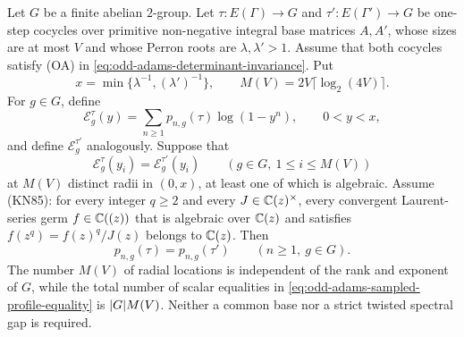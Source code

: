 \begin{theorem}
\label{thm:odd-adams-abelian-two-group-finite-sampling}
Let \(G\) be a finite abelian \(2\)-group.  Let
\(\tau:E(\Gamma)\to G\) and \(\tau':E(\Gamma')\to G\) be one-step
cocycles over primitive non-negative integral base matrices \(A,A'\), whose
sizes are at most \(V\) and whose Perron roots are
\(\lambda,\lambda'>1\).  Assume that both cocycles satisfy (OA) in
\eqref{eq:odd-adams-determinant-invariance}.  Put
\[
 x=\min\{\lambda^{-1},(\lambda')^{-1}\},\qquad
 M(V)=2V\lceil\log_2(4V)\rceil.
\]
For \(g\in G\), define
\[
 \mathcal E_g^\tau(y)
 =\sum_{n\ge1}p_{n,g}(\tau)\log(1-y^n),\qquad 0<y<x,
\]
and define \(\mathcal E_g^{\tau'}\) analogously.  Suppose that
\begin{equation}\label{eq:odd-adams-sampled-profile-equality}
 \mathcal E_g^\tau(y_i)=\mathcal E_g^{\tau'}(y_i)
 \qquad(g\in G,\ 1\le i\le M(V))
\end{equation}
at \(M(V)\) distinct radii in \((0,x)\), at least one of which is algebraic.
Assume \textup{(KN85)}: for every integer \(q\ge2\) and every
\(J\in\mathbb{C}(z)^\times\), every convergent Laurent-series germ
\(f\in\mathbb{C}((z))\) that is algebraic over \(\mathbb{C}(z)\) and satisfies
\(f(z^q)=f(z)^q/J(z)\) belongs to \(\mathbb{C}(z)\).  Then
\[
 p_{n,g}(\tau)=p_{n,g}(\tau')
 \qquad(n\ge1,\ g\in G).
\]
The number \(M(V)\) of radial locations is independent of the rank and
exponent of \(G\), while the total number of scalar equalities in
\eqref{eq:odd-adams-sampled-profile-equality} is \(\lvert G \rvert M(V)\).
Neither a common base nor a strict twisted spectral gap is required.
\end{theorem}


